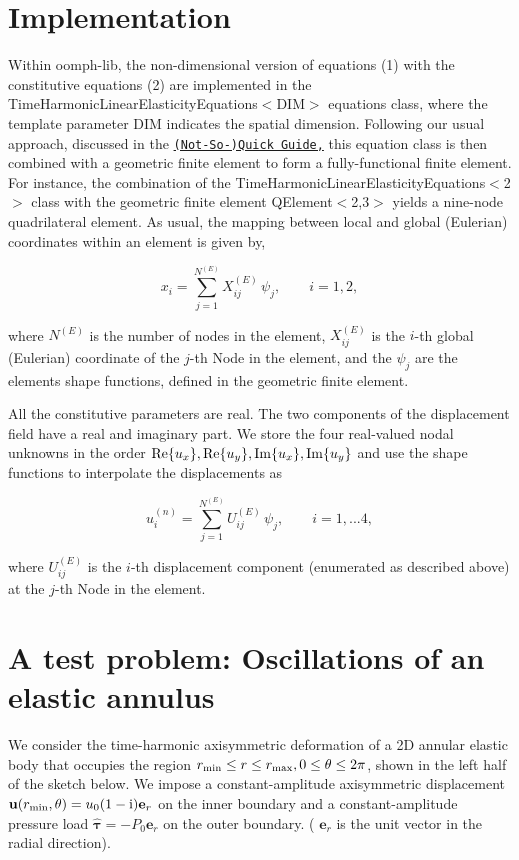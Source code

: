  

\hypertarget{index_element_types}{}\section{Implementation}\label{index_element_types}
Within {\ttfamily oomph-\/lib}, the non-\/dimensional version of equations (1) with the constitutive equations (2) are implemented in the {\ttfamily Time\+Harmonic\+Linear\+Elasticity\+Equations$<$\+D\+I\+M$>$} equations class, where the template parameter {\ttfamily D\+IM} indicates the spatial dimension. Following our usual approach, discussed in the \href{../../../quick_guide/html/index.html}{\tt (Not-\/\+So-\/)Quick Guide,} this equation class is then combined with a geometric finite element to form a fully-\/functional finite element. For instance, the combination of the {\ttfamily Time\+Harmonic\+Linear\+Elasticity\+Equations$<$2$>$} class with the geometric finite element {\ttfamily Q\+Element$<$2,3$>$} yields a nine-\/node quadrilateral element. As usual, the mapping between local and global (Eulerian) coordinates within an element is given by, \begin{center} \[ x_i = \sum_{j=1}^{N^{(E)}} X^{(E)}_{ij} \, \psi_j, \qquad i=1,2, \] \end{center}  where $ N^{(E)} $ is the number of nodes in the element, $ X^{(E)}_{ij} $ is the $ i $-\/th global (Eulerian) coordinate of the $ j $-\/th {\ttfamily Node} in the element, and the $ \psi_j $ are the element\textquotesingle{}s shape functions, defined in the geometric finite element.

All the constitutive parameters are real. The two components of the displacement field have a real and imaginary part. We store the four real-\/valued nodal unknowns in the order $ {\rm Re}\{u_x\}, {\rm Re}\{u_y\}, {\rm Im}\{u_x\}, {\rm Im}\{u_y\} $ and use the shape functions to interpolate the displacements as \begin{center} \[ u_i^{(n)} = \sum_{j=1}^{N^{(E)}} U^{(E)}_{ij} \, \psi_j, \qquad i=1,...4, \] \end{center}  where $ U^{(E)}_{ij} $ is the $ i $-\/th displacement component (enumerated as described above) at the $ j $-\/th {\ttfamily Node} in the element.



 

\hypertarget{index_test}{}\section{A test problem\+: Oscillations of an elastic annulus}\label{index_test}
We consider the time-\/harmonic axisymmetric deformation of a 2D annular elastic body that occupies the region $ r_{\rm min}\leq r\leq r_{\rm max}, 0\leq\theta\leq 2\pi $, shown in the left half of the sketch below. We impose a constant-\/amplitude axisymmetric displacement $ {\mathbf{u}}(r_{\rm min},\theta)= u_0 (1-{\rm i}) {\mathbf{e}}_r$ on the inner boundary and a constant-\/amplitude pressure load $ \pmb{\hat{\tau}} = -P_0 {\mathbf{e}}_r $ on the outer boundary. ( $ {\mathbf{e}}_r $ is the unit vector in the radial direction).

